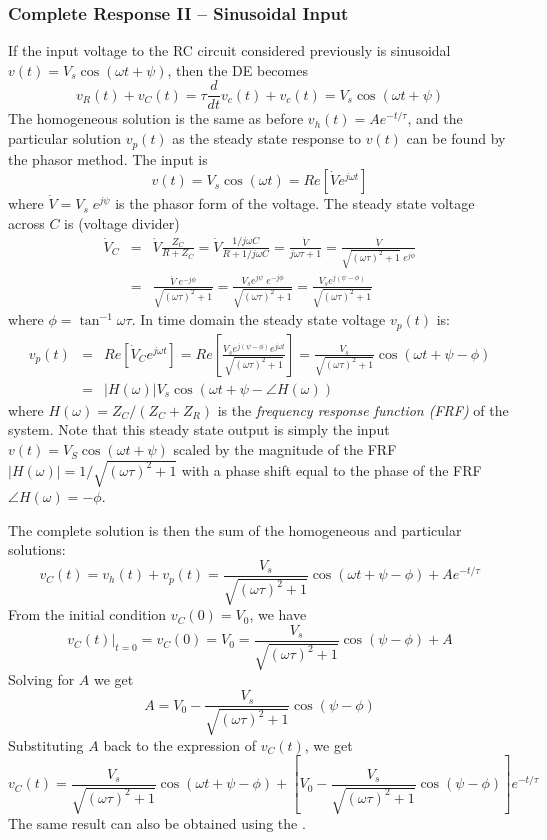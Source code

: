 \subsubsection*{Complete Response II -- Sinusoidal Input}

If the input voltage to the RC circuit considered previously is sinusoidal 
$v(t)=V_s \cos(\omega t+\psi)$, then the DE becomes
\[
v_R(t)+v_C(t)=\tau\frac{d}{dt} v_c(t)+v_c(t)=V_s \cos(\omega t+\psi)	
\]
The homogeneous solution is the same as before $v_h(t)=A e^{-t/\tau}$,
and the particular solution $v_p(t)$ as the steady state response to 
$v(t)$ can be found by the phasor method. The input is 
\[
v(t)=V_s \cos(\omega t)=Re[\dot{V} e^{j\omega t}]	
\]
where $\dot{V}=V_s\; e^{j\psi}$ is the phasor form of the voltage.
The steady state voltage across $C$ is (voltage divider)
\begin{eqnarray}
  \dot{V}_C&=&\dot{V} \frac{Z_C}{R+Z_C}
  =\dot{V} \frac{1/j\omega C}{R+1/j\omega C}=\frac{\dot{V}}{j\omega \tau+1}	
  =\frac{\dot{V}}{\sqrt{(\omega \tau)^2+1}\;e^{j\phi}} 
  \nonumber \\
  &=&\frac{\dot{V}\;e^{-j\phi}}{\sqrt{(\omega \tau)^2+1}} 
  =\frac{V_se^{j\psi}\;e^{-j\phi}}{\sqrt{(\omega \tau)^2+1}} 
  =\frac{V_se^{j(\psi-\phi)}}{\sqrt{(\omega \tau)^2+1}} 
\nonumber
\end{eqnarray}
where $\phi=\tan^{-1} \omega \tau$. In time domain the steady state 
voltage $v_p(t)$ is:
\begin{eqnarray}
  v_p(t)&=&Re\left[\dot{V}_C e^{j\omega t} \right]
  =Re\left[ \frac{V_s e^{j(\psi-\phi)} e^{j\omega t}}{\sqrt{(\omega \tau)^2+1}} \right]
  = \frac{V_s}{\sqrt{(\omega \tau)^2+1}} \cos(\omega t+\psi-\phi)
  \nonumber\\
  &=&|H(\omega)|V_s\cos(\omega t+\psi-\angle H(\omega))
  \nonumber
\end{eqnarray}
where $H(\omega)=Z_C/(Z_C+Z_R)$ is the {\em frequency response function 
(FRF)} of the system. Note that this steady state output is simply the 
input $v(t)=V_S\cos(\omega t+\psi)$ scaled by the magnitude of the FRF
$|H(\omega)|=1/\sqrt{(\omega\tau)^2+1}$ with a phase shift equal to the 
phase of the FRF $\angle H(\omega)=-\phi$.

The complete solution is then the sum of the homogeneous and particular
solutions:
\[
v_C(t)=v_h(t)+v_p(t)=
\frac{V_s}{\sqrt{(\omega \tau)^2+1}}\cos(\omega t+\psi-\phi)+A e^{-t/\tau} 
\]
From the initial condition $v_C(0)=V_0$, we have
\[
v_C(t)\bigg|_{t=0}=v_C(0)
=V_0=\frac{V_s}{\sqrt{(\omega \tau)^2+1}}\cos(\psi-\phi)+A 
\]
Solving for $A$ we get
\[
A=V_0-\frac{V_s}{\sqrt{(\omega \tau)^2+1}}\cos(\psi-\phi) 
\]
Substituting $A$ back to the expression of $v_C(t)$, we get 
\[
v_C(t)=\frac{V_s}{\sqrt{(\omega \tau)^2+1}}\cos(\omega t+\psi-\phi)+ 
\left[V_0-\frac{V_s}{\sqrt{(\omega \tau)^2+1}}\cos(\psi-\phi)\right] e^{-t/\tau}	
\]
The same result can also be obtained using the 
.

